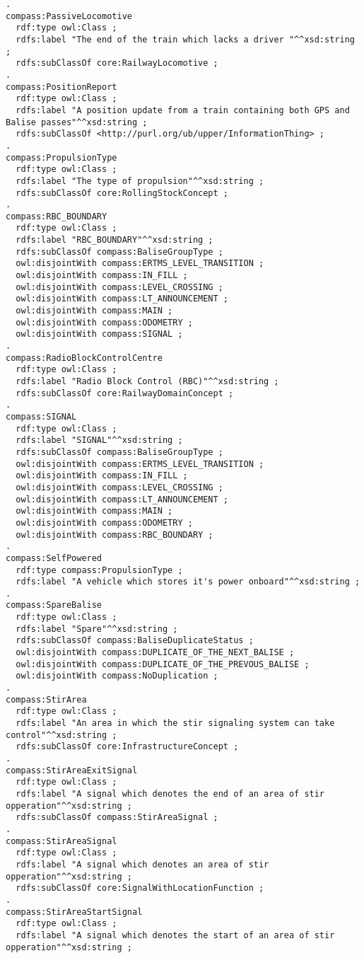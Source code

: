 \begin{frame}[fragile]
\begin{lstlisting}[float=b,language=sparql,frame=tb,caption={Mapping of RaCoOn to COMPASS project data},label=lst:racooncompassmap]
.
compass:PassiveLocomotive
  rdf:type owl:Class ;
  rdfs:label "The end of the train which lacks a driver "^^xsd:string ;
  rdfs:subClassOf core:RailwayLocomotive ;
.
compass:PositionReport
  rdf:type owl:Class ;
  rdfs:label "A position update from a train containing both GPS and  Balise passes"^^xsd:string ;
  rdfs:subClassOf <http://purl.org/ub/upper/InformationThing> ;
.
compass:PropulsionType
  rdf:type owl:Class ;
  rdfs:label "The type of propulsion"^^xsd:string ;
  rdfs:subClassOf core:RollingStockConcept ;
.
compass:RBC_BOUNDARY
  rdf:type owl:Class ;
  rdfs:label "RBC_BOUNDARY"^^xsd:string ;
  rdfs:subClassOf compass:BaliseGroupType ;
  owl:disjointWith compass:ERTMS_LEVEL_TRANSITION ;
  owl:disjointWith compass:IN_FILL ;
  owl:disjointWith compass:LEVEL_CROSSING ;
  owl:disjointWith compass:LT_ANNOUNCEMENT ;
  owl:disjointWith compass:MAIN ;
  owl:disjointWith compass:ODOMETRY ;
  owl:disjointWith compass:SIGNAL ;
.
compass:RadioBlockControlCentre
  rdf:type owl:Class ;
  rdfs:label "Radio Block Control (RBC)"^^xsd:string ;
  rdfs:subClassOf core:RailwayDomainConcept ;
.
compass:SIGNAL
  rdf:type owl:Class ;
  rdfs:label "SIGNAL"^^xsd:string ;
  rdfs:subClassOf compass:BaliseGroupType ;
  owl:disjointWith compass:ERTMS_LEVEL_TRANSITION ;
  owl:disjointWith compass:IN_FILL ;
  owl:disjointWith compass:LEVEL_CROSSING ;
  owl:disjointWith compass:LT_ANNOUNCEMENT ;
  owl:disjointWith compass:MAIN ;
  owl:disjointWith compass:ODOMETRY ;
  owl:disjointWith compass:RBC_BOUNDARY ;
.
compass:SelfPowered
  rdf:type compass:PropulsionType ;
  rdfs:label "A vehicle which stores it's power onboard"^^xsd:string ;
.
compass:SpareBalise
  rdf:type owl:Class ;
  rdfs:label "Spare"^^xsd:string ;
  rdfs:subClassOf compass:BaliseDuplicateStatus ;
  owl:disjointWith compass:DUPLICATE_OF_THE_NEXT_BALISE ;
  owl:disjointWith compass:DUPLICATE_OF_THE_PREVOUS_BALISE ;
  owl:disjointWith compass:NoDuplication ;
.
compass:StirArea
  rdf:type owl:Class ;
  rdfs:label "An area in which the stir signaling system can take control"^^xsd:string ;
  rdfs:subClassOf core:InfrastructureConcept ;
.
compass:StirAreaExitSignal
  rdf:type owl:Class ;
  rdfs:label "A signal which denotes the end of an area of stir opperation"^^xsd:string ;
  rdfs:subClassOf compass:StirAreaSignal ;
.
compass:StirAreaSignal
  rdf:type owl:Class ;
  rdfs:label "A signal which denotes an area of stir opperation"^^xsd:string ;
  rdfs:subClassOf core:SignalWithLocationFunction ;
.
compass:StirAreaStartSignal
  rdf:type owl:Class ;
  rdfs:label "A signal which denotes the start of an area of stir opperation"^^xsd:string ;

\end{lstlisting}
\end{frame}
